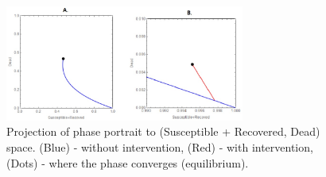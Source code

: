 \begin{figure}[!h]
  \centering
  \includegraphics[width=0.7\textwidth]{PhasePortrait}
  \caption{Projection of phase portrait to (Susceptible + Recovered, Dead) space. (Blue) - without intervention, (Red) - with intervention, (Dots) - where the phase converges (equilibrium).}
\label{fig:Phase Portrait}
\end{figure}

